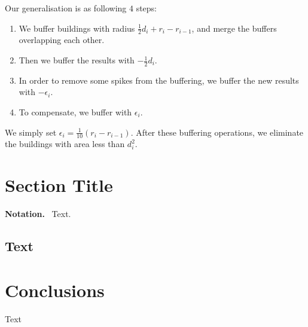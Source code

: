 \documentclass[graybox]{svmult}
\newcommand{\mypar}[1]{\bigskip\noindent\textbf{#1.}~}
\begin{document}
Our generalisation is as following $4$ steps:
\begin{enumerate}[label=(\alph*),leftmargin=2\parindent]
	\item We buffer buildings with 
	radius $\frac{1}{2}d_i+r_i-r_{i-1}$, and merge the buffers 
	overlapping each other.
	\item Then we buffer the results with $-\frac{1}{2}d_i$.
	\item In order to 
	remove some spikes from the buffering, we buffer the new 
	results with $-\epsilon_i$.
	\item To compensate, we buffer with $\epsilon_i$.	
\end{enumerate}
We simply set 
$\epsilon_i=\frac{1}{10}(r_i-r_{i-1})$. After these buffering 
operations, we eliminate the buildings with area less than 
$d^2_i$.







\section{Section Title}
\label{sec:AStarAlgorithm}

\mypar{Notation}
Text. 

\subsection{Text}
\label{sec:Formalizing}



\section{Conclusions}
\label{sec:Conclusions}

Text

\printbibliography
%
%
\end{document}
